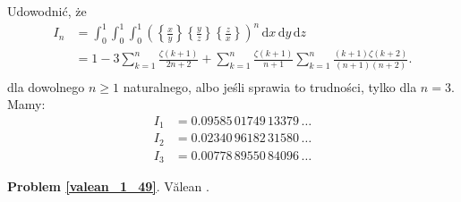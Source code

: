 %

\begin{problem_with_solution}
    \label{valean_1_49}%
    Udowodnić, że 
    \begin{align}
        I_n & = \int_0^1 \int_0^1 \int_0^1 \left( \left\{\frac x y \right\} \left\{\frac yz\right\} \left\{\frac zx \right\} \right)^n \,\mathrm{d}x\,\mathrm{d}y\,\mathrm{d}z \\
        & = 1 - 3 \sum_{k=1}^n \frac{\zeta(k+1)}{2n+2}  + \sum_{k=1}^n \frac{\zeta(k+1)}{n+1} \sum_{k=1}^n \frac{(k+1) \zeta(k+2)}{(n+1)(n+2)} . \\
    \end{align} 
    dla dowolnego $n \ge 1$ naturalnego, albo jeśli sprawia to trudności, tylko dla $n = 3$.
    Mamy:
    \begin{align}
        I_1 & = 0.09585\,01749\,13379\,\ldots \\
        I_2 & = 0.02340\,96182\,31580\,\ldots \\
        I_3 & = 0.00778\,89550\,84096\,\ldots %
    \end{align}
\end{problem_with_solution}


\textbf{Problem \ref{valean_1_49}}.
Vălean \cite[s. 31]{nahin15}.


%